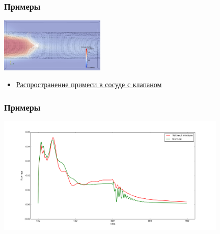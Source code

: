 \documentclass[14pt]{beamer}
\begin{document}
\begin{frame}
\frametitle{Примеры}
    \begin{center}
        \includegraphics[width=5cm]{valves_with_source_avi.png}
    \end{center}

\begin{itemize}
    \item[\MVRightarrow] \href{run:video/valves_with_source.avi}{Распространение примеси в сосуде с клапаном}
\end{itemize}
\end{frame}

\begin{frame}
\frametitle{Примеры}
    \begin{center}
        \includegraphics[width=11cm]{flow_rate_comparison.png}
    \end{center}
\end{frame}
\end{document}
